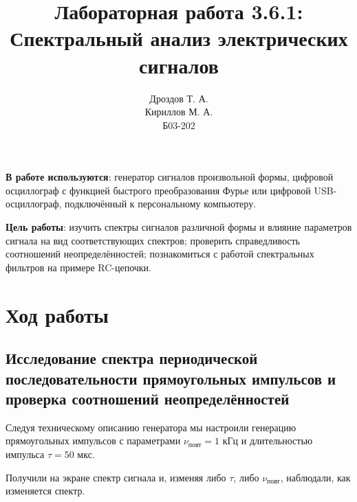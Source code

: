 \documentclass[a4paper,12pt]{article}
\title{Лабораторная работа 3.6.1:\\Спектральный анализ электрических сигналов}
\author{Дроздов Т. А.\\Кириллов М. А.\\Б03-202}
\date{}
\begin{document}
\maketitle

\textbf{В работе используются}: генератор сигналов произвольной формы, цифровой осциллограф с функцией быстрого преобразования Фурье или цифровой USB-осциллограф, подключённый к персональному компьютеру.


\textbf{Цель работы}: 
изучить спектры сигналов различной формы и влияние параметров сигнала
на вид соответствующих спектров; проверить справедливость соотношений неопределённостей; познакомиться с работой спектральных фильтров на примере RC-цепочки.



\section*{Ход работы}
 \subsection*{Исследование спектра периодической последовательности прямоугольных импульсов и проверка соотношений неопределённостей}
Следуя техническому описанию генератора мы настроили генерацию прямоугольных импульсов с параметрами $\nu_{\text{повт}} = 1$ кГц и длительностью импульса $\tau = 50$ мкс.

Получили на экране спектр сигнала и, изменяя либо $\tau$, либо $\nu_{\text{повт}}$, наблюдали, как изменяется спектр.
\begin{figure}
    \centering
    \\
    \\
    \\
\end{figure}
\end{document}
